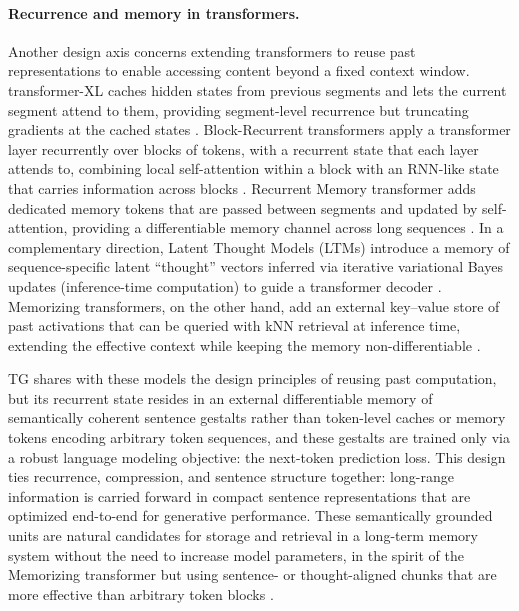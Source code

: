 \documentclass{article}
\begin{document}
\paragraph{Recurrence and memory in transformers.}
Another design axis concerns extending transformers to reuse past representations to enable accessing content beyond a fixed context window. 
transformer-XL caches hidden states from previous segments and lets the current segment attend to them, providing segment-level recurrence but truncating gradients at the cached states \citep{dai2019transformerxl}.
Block-Recurrent transformers apply a transformer layer recurrently over blocks of tokens, with a recurrent state that each layer attends to, combining local self-attention within a block with an RNN-like state that carries information across blocks \citep{hutchins2022blockrecurrent}. 
Recurrent Memory transformer adds dedicated memory tokens that are passed between segments and updated by self-attention, providing a differentiable memory channel across long sequences \citep{bulatov2022rmt}.
In a complementary direction, Latent Thought Models (LTMs) introduce a memory of sequence-specific latent ``thought'' vectors inferred via iterative variational Bayes updates (inference-time computation) to guide a transformer decoder \citep{kong2025latent}.
Memorizing transformers, on the other hand, add an external key--value store of past activations that can be queried with kNN retrieval at inference time, extending the effective context while keeping the memory non-differentiable \citep{wu2022memorizing}.


TG shares with these models the design principles of reusing past computation, but its recurrent state resides in an external differentiable memory of semantically coherent sentence gestalts rather than token-level caches or memory tokens encoding arbitrary token sequences, and these gestalts are trained only via a robust language modeling objective: the next-token prediction loss.
This design ties recurrence, compression, and sentence structure together: long-range information is carried forward in compact sentence representations that are optimized end-to-end for generative performance. These semantically grounded units are natural candidates for storage and retrieval in a long-term memory system without the need to increase model parameters, in the spirit of the Memorizing transformer but using sentence- or thought-aligned chunks that are more effective than arbitrary token blocks \citep{glaforge2025sentencewindow,bhat2025rethinkingchunk}. 
\end{document}
